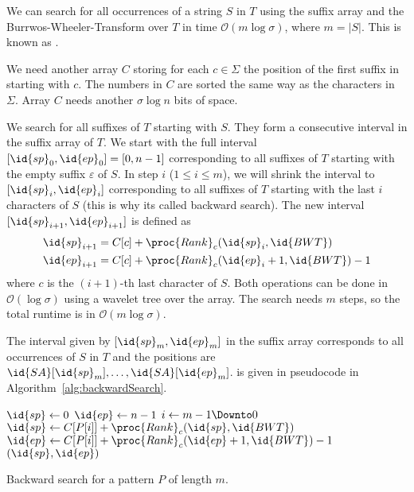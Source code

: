 \begin{Theorem}
  We can search for all occurrences of a string $S$ in $T$ using the suffix array  and the Burrwos-Wheeler-Transform  over $T$ in time $\mathcal{O}(m\log \sigma)$, where $m = \vert S \vert$. This is known as .
\end{Theorem}

\begin{Proof}
  We need another array $C$ storing for each $c \in \Sigma$ the position of the first suffix in~ starting with $c$. The numbers in $C$ are sorted the same way as the characters in~$\Sigma$. Array $C$ needs another $\sigma\log n$ bits of space.

  We search for all suffixes of $T$ starting with $S$. They form a consecutive interval in the suffix array  of $T$. We start with the full interval $[\id{sp}_0,\id{ep}_0]=[0,n-1]$ corresponding to all suffixes of $T$ starting with the empty suffix $\varepsilon$ of $S$. In step $i$ ($1 \leq i \leq m$), we will shrink the interval to $[\id{sp}_i,\id{ep}_i]$ corresponding to all suffixes of $T$ starting with the last $i$ characters of $S$ (this is why its called backward search). The new interval $[\id{sp}_{i+1},\id{ep}_{i+1}]$ is defined as
  \begin{align}
    \id{sp}_{i+1} &= C[c] + \proc{Rank}_c(\id{sp}_i, \id{BWT})
    \label{eq:backwardSearchStartPos} \\
    \id{ep}_{i+1} &= C[c] + \proc{Rank}_c(\id{ep}_i + 1, \id{BWT}) - 1
    \label{eq:backwardSearchEndPos}
  \end{align}
  where $c$ is the $(i+1)$-th last character of $S$. Both operations can be done in $\mathcal{O}(\log\sigma)$ using a wavelet tree over the  array. The search needs $m$ steps, so the total runtime is in $\mathcal{O}(m\log\sigma)$.

  The interval given by $[\id{sp}_m,\id{ep}_m]$ in the suffix array corresponds to all occurrences of $S$ in $T$ and the positions are $\id{SA}[\id{sp}_m], \ldots, \id{SA}[\id{ep}_m]$.  is given in pseudocode in Algorithm~\ref{alg:backwardSearch}.
\end{Proof}

\begin{algorithm}[htb]
  \begin{codebox}
    \li $\id{sp} \gets 0$
    \li $\id{ep} \gets n - 1$
    \li \For $i \gets m - 1 \Downto 0$
        \Do
    \li   $\id{sp} \gets C[P[i]] + \proc{Rank}_c(\id{sp}, \id{BWT})$
    \li   $\id{ep} \gets C[P[i]] + \proc{Rank}_c(\id{ep} + 1, \id{BWT}) - 1$
        \End
    \li \Return $(\id{sp}, \id{ep})$
  \end{codebox}
  \caption{Backward search for a pattern $P$ of length $m$.}
  \label{alg:backwardSearch}
\end{algorithm}

